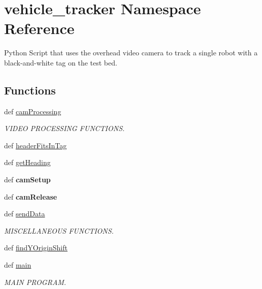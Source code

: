 \hypertarget{namespacevehicle__tracker}{\section{vehicle\+\_\+tracker Namespace Reference}
\label{namespacevehicle__tracker}
}


Python Script that uses the overhead video camera to track a single robot with a black-\/and-\/white tag on the test bed.  


\subsection*{Functions}
\begin{DoxyCompactItemize}
\item 
def \hyperlink{namespacevehicle__tracker_a221a44646e51c3fd4cbc83c53626068b}{cam\+Processing}
\begin{DoxyCompactList}\small\item\em V\+I\+D\+E\+O P\+R\+O\+C\+E\+S\+S\+I\+N\+G F\+U\+N\+C\+T\+I\+O\+N\+S. \end{DoxyCompactList}\item 
def \hyperlink{namespacevehicle__tracker_a102610b23ea2aa109fc9fd3018193839}{header\+Fits\+In\+Tag}
\item 
def \hyperlink{namespacevehicle__tracker_a6fec5885209bd01e07e9fb7c1b42d392}{get\+Heading}
\item 
\hypertarget{namespacevehicle__tracker_a87e7d02b8b0e540f11d2c84ec489c267}{def {\bfseries cam\+Setup}}\label{namespacevehicle__tracker_a87e7d02b8b0e540f11d2c84ec489c267}

\item 
\hypertarget{namespacevehicle__tracker_a0515dfbe970e00803badb9f03ac07012}{def {\bfseries cam\+Release}}\label{namespacevehicle__tracker_a0515dfbe970e00803badb9f03ac07012}

\item 
def \hyperlink{namespacevehicle__tracker_ab3072b82b7fed8b6cb2a5cd060e8ebe2}{send\+Data}
\begin{DoxyCompactList}\small\item\em M\+I\+S\+C\+E\+L\+L\+A\+N\+E\+O\+U\+S F\+U\+N\+C\+T\+I\+O\+N\+S. \end{DoxyCompactList}\item 
def \hyperlink{namespacevehicle__tracker_a616fcc6ed4b0c42005e50b0d2533707e}{find\+Y\+Origin\+Shift}
\item 
\hypertarget{namespacevehicle__tracker_a4ccd3464da8ed5251f1b47ac848e77e7}{def \hyperlink{namespacevehicle__tracker_a4ccd3464da8ed5251f1b47ac848e77e7}{main}}\label{namespacevehicle__tracker_a4ccd3464da8ed5251f1b47ac848e77e7}

\begin{DoxyCompactList}\small\item\em M\+A\+I\+N P\+R\+O\+G\+R\+A\+M. \end{DoxyCompactList}\end{DoxyCompactItemize}
